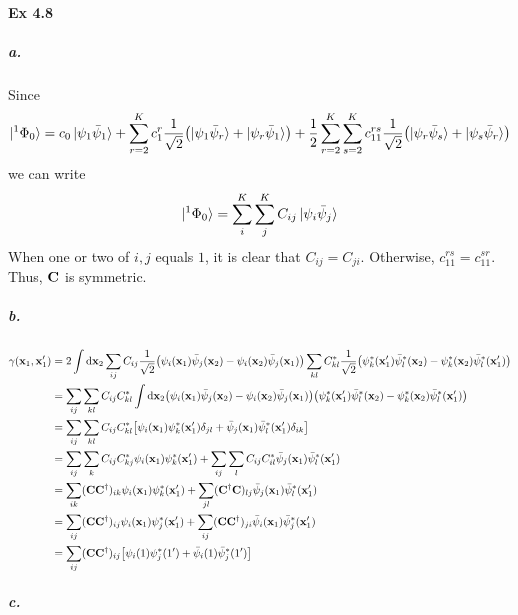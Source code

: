 \documentclass[a4paper]{article}
\newcommand{\ex}[1]{\paragraph{Ex #1}}
\newcommand{\subex}[1]{\subparagraph{#1}}
\numberwithin{equation}{subsection}
\begin{document}
\ex{4.8}
\subex{a.}
Since 
\begin{equation}\label{key}
\ket{^1\Phi_0} = c_0\ket{\psi_1\bar\psi_1} + \sum_{r=2}^K c_1^r \dfrac{1}{\sqrt{2}}\qty(\ket{\psi_1\bar\psi_r} + \ket{\psi_r\bar\psi_1}) + \dfrac{1}{2}\sum_{r=2}^K\sum_{s=2}^K c_{11}^{rs}\dfrac{1}{\sqrt{2}} \qty(\ket{\psi_r\bar\psi_s} + \ket{\psi_s\bar\psi_r})
\end{equation}
we can write
\begin{equation}\label{key}
\ket{^1\Phi_0} = \sum_i^K \sum_j^K C_{ij}\ket{\psi_i\bar\psi_j}
\end{equation}
When one or two of $ i,j $ equals $ 1 $, it is clear that $ C_{ij} = C_{ji} $. Otherwise, $ c_{11}^{rs} = c_{11}^{sr} $. \\
Thus, $ \vb{C} $ is symmetric.
\subex{b.}
\begin{align}
\gamma(\vb{x}_1,\vb{x}'_1) &= 2\int\dd\vb{x}_2 \sum_{ij} C_{ij} \dfrac{1}{\sqrt{2}} \qty(\psi_i(\vb{x}_1)\bar\psi_j(\vb{x}_2) - \psi_i(\vb{x}_2)\bar\psi_j(\vb{x}_1)) 
\sum_{kl} C^*_{kl} \dfrac{1}{\sqrt{2}} \qty(\psi_k^*(\vb{x}'_1)\bar\psi_l^*(\vb{x}_2) - \psi_k^*(\vb{x}_2)\bar\psi_l^*(\vb{x}'_1)) \notag\\
&= \sum_{ij}\sum_{kl} C_{ij} C^*_{kl} \int\dd\vb{x}_2 \qty(\psi_i(\vb{x}_1)\bar\psi_j(\vb{x}_2) - \psi_i(\vb{x}_2)\bar\psi_j(\vb{x}_1)) 
\qty(\psi_k^*(\vb{x}'_1)\bar\psi_l^*(\vb{x}_2) - \psi_k^*(\vb{x}_2)\bar\psi_l^*(\vb{x}'_1)) \notag\\
&= \sum_{ij}\sum_{kl} C_{ij} C^*_{kl} 
\qty[\psi_i(\vb{x}_1)\psi_k^*(\vb{x}'_1)\delta_{jl}
 + \bar\psi_j(\vb{x}_1)\bar\psi_l^*(\vb{x}'_1)\delta_{ik}
] \notag\\
&= \sum_{ij}\sum_k C_{ij} C^*_{kj} \psi_i(\vb{x}_1)\psi_k^*(\vb{x}'_1)
+ \sum_{ij}\sum_l C_{ij} C^*_{il} \bar\psi_j(\vb{x}_1)\bar\psi_l^*(\vb{x}'_1)
 \notag\\
&= \sum_{ik} (\vb{C}\vb{C}^\dagger)_{ik} \psi_i(\vb{x}_1)\psi_k^*(\vb{x}'_1)
+ \sum_{jl} (\vb{C}^\dagger\vb{C})_{lj} \bar\psi_j(\vb{x}_1)\bar\psi_l^*(\vb{x}'_1)
\notag\\
&= \sum_{ij} (\vb{C}\vb{C}^\dagger)_{ij} \psi_i(\vb{x}_1)\psi_j^*(\vb{x}'_1)
+ \sum_{ij} (\vb{C}\vb{C}^\dagger)_{ji} \bar\psi_i(\vb{x}_1)\bar\psi_j^*(\vb{x}'_1)
\notag\\
&= \sum_{ij} (\vb{C}\vb{C}^\dagger)_{ij} \qty[\psi_i(1)\psi_j^*(1')
+ \bar\psi_i(1)\bar\psi_j^*(1')]
\end{align}
\subex{c.}
\end{document}
